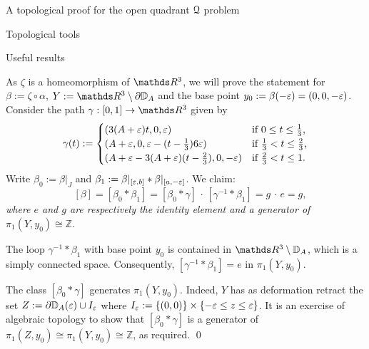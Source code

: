 \documentclass[11pt, a4paper, english, twoside, notitlepage, openright]{report}
\begin{document}
\begin{chapter}{A topological proof for the open quadrant $\mathcal{Q}$ problem}
\begin{section}{Topological tools}
\begin{subsection}{Useful results}
\begin{lemma}
\begin{Proof}
As $\zeta$ is a homeomorphism of $\R^3$, we will prove the statement for $\beta:=\zeta\circ\alpha$, $Y:=\R^3\setminus\partial{\mathbb D}_A$ and the base point $y_0:=\beta(-\varepsilon)=(0,0,-\varepsilon)$. Consider the path $\gamma:[0,1]\rightarrow\R^3$ given by
$$
\gamma(t):=
\begin{cases}
(3(A+\varepsilon)t,0,\varepsilon)&\text{if $0\le t\le\frac{1}{3}$,}\\
(A+\varepsilon, 0, \varepsilon-(t-\frac{1}{3})6\varepsilon)&\text{if $\frac{1}{3}<t\le \frac{2}{3}$,}\\
(A+\varepsilon-3(A+\varepsilon)(t-\frac{2}{3}), 0, -\varepsilon)&\text{if $\frac{2}{3}<t\le 1$}.
\end{cases}
$$
Write $\beta_0:=\beta|_{J}$ and $\beta_1:=\beta|_{[\varepsilon,b]}\ast\beta|_{[a,-\varepsilon]}$. We claim:\em
$$
\quad[\beta]=[\beta_0\ast\beta_1]=[\beta_0\ast\gamma]\,\cdot\,[\gamma^{-1}\ast\beta_1]=g\,\cdot\,e=g,
$$
where $e$ and $g$ are respectively the identity element and a generator of $\pi_1(Y,y_0)\cong{\mathbb Z}$\em.

The loop $\gamma^{-1}\ast\beta_1$ with base point $y_0$ is contained in $\R^3\setminus{\mathbb D}_A$, which is a simply connected space. Consequently, $[\gamma^{-1}*\beta_1]=e$ in $\pi_1(Y,y_0)$. 

The class $[\beta_0\ast\gamma]$ generates $\pi_1(Y,y_0)$. Indeed, $Y$ has as deformation retract the set $Z:=\partial{\mathbb D}_A(\varepsilon)\cup I_\varepsilon$ where $I_\varepsilon:=\{(0,0)\}\times\{-\varepsilon\le z\le \varepsilon\}$. It is an exercise of algebraic topology to show that $[\beta_0\ast\gamma]$ is a generator of $\pi_1(Z,y_0)\cong\pi_1(Y,y_0)\cong{\mathbb Z}$, as required.
\qed 
\end{Proof}
\end{lemma}


\end{subsection}
\end{section}
\end{chapter}
\end{document}
